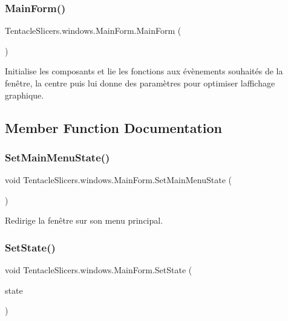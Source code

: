 \subsubsection{\texorpdfstring{Main\+Form()}{MainForm()}}
{\footnotesize\ttfamily Tentacle\+Slicers.\+windows.\+Main\+Form.\+Main\+Form (\begin{DoxyParamCaption}{ }\end{DoxyParamCaption})}



Initialise les composants et lie les fonctions aux évènements souhaités de la fenêtre, la centre puis lui donne des paramètres pour optimiser l\textquotesingle{}affichage graphique. 



\subsection{Member Function Documentation}
\mbox{\label{class_tentacle_slicers_1_1windows_1_1_main_form_a07b1f7939f2b2def69267b20066eec16}} 
\subsubsection{\texorpdfstring{Set\+Main\+Menu\+State()}{SetMainMenuState()}}
{\footnotesize\ttfamily void Tentacle\+Slicers.\+windows.\+Main\+Form.\+Set\+Main\+Menu\+State (\begin{DoxyParamCaption}{ }\end{DoxyParamCaption})}



Redirige la fenêtre sur son menu principal. 

\mbox{\label{class_tentacle_slicers_1_1windows_1_1_main_form_a2461078968bccf75e2e7c39ec2f639b4}} 
\subsubsection{\texorpdfstring{Set\+State()}{SetState()}}
{\footnotesize\ttfamily void Tentacle\+Slicers.\+windows.\+Main\+Form.\+Set\+State (\begin{DoxyParamCaption}\item[{\hyperlink{class_tentacle_slicers_1_1windows_1_1_windows_state}{Windows\+State}}]{state }\end{DoxyParamCaption})}




